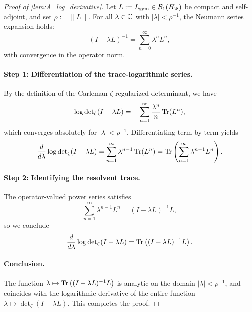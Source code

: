 \begin{proof}[Proof of \cref{lem:A_log_derivative}]
Let \( L := L_{\mathrm{sym}} \in \mathcal{B}_1(H_{\Psi}) \) be compact and self-adjoint, and set \( \rho := \|L\| \). For all \( \lambda \in \mathbb{C} \) with \( |\lambda| < \rho^{-1} \), the Neumann series expansion holds:
\[
(I - \lambda L)^{-1} = \sum_{n=0}^\infty \lambda^n L^n,
\]
with convergence in the operator norm.

\paragraph{Step 1: Differentiation of the trace-logarithmic series.}
By the definition of the Carleman \(\zeta\)-regularized determinant, we have
\[
\log \det\nolimits_\zeta(I - \lambda L)
= - \sum_{n=1}^\infty \frac{\lambda^n}{n} \operatorname{Tr}(L^n),
\]
which converges absolutely for \( |\lambda| < \rho^{-1} \). Differentiating term-by-term yields
\[
\frac{d}{d\lambda} \log \det\nolimits_\zeta(I - \lambda L)
= \sum_{n=1}^\infty \lambda^{n-1} \operatorname{Tr}(L^n)
= \operatorname{Tr}\left( \sum_{n=1}^\infty \lambda^{n-1} L^n \right).
\]

\paragraph{Step 2: Identifying the resolvent trace.}
The operator-valued power series satisfies
\[
\sum_{n=1}^\infty \lambda^{n-1} L^n = (I - \lambda L)^{-1} L,
\]
so we conclude
\[
\frac{d}{d\lambda} \log \det\nolimits_\zeta(I - \lambda L)
= \operatorname{Tr}\left( (I - \lambda L)^{-1} L \right).
\]

\paragraph{Conclusion.}
The function \( \lambda \mapsto \operatorname{Tr}\left( (I - \lambda L)^{-1} L \right) \) is analytic on the domain \( |\lambda| < \rho^{-1} \), and coincides with the logarithmic derivative of the entire function \( \lambda \mapsto \det\nolimits_\zeta(I - \lambda L) \). This completes the proof.
\end{proof}
